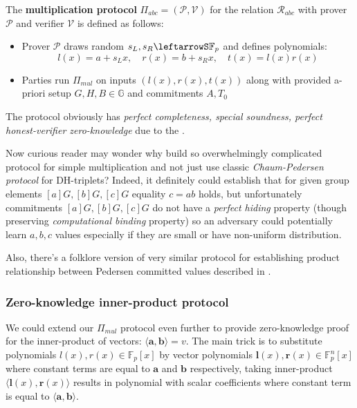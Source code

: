 \documentclass[../lecture-notes-148x210.tex]{subfiles}
\begin{document}
\begin{definition}
    The \textbf{multiplication protocol} $\Pi_{abc} = (\mathcal{P,V})$ for the relation $\mathcal{R}_{abc}$ with prover $\mathcal{P}$ and verifier $\mathcal{V}$ is defined as follows:
    \begin{itemize}
        \item Prover $\mathcal{P}$ draws random $s_L, s_R \leftarrowS \mathbb{F}_p$ and defines polynomials: $$l(x)=a+s_L x,\quad r(x)=b+s_R x,\quad t(x)=l(x)r(x)$$
        \item Parties run $\Pi_{mul}$ on inputs $(l(x),r(x),t(x))$ along with provided a-priori setup $G,H,B \in \mathbb{G}$ and commitments $A, T_0$
    \end{itemize}
\end{definition}
The protocol obviously has \textit{perfect completeness, special soundness, perfect honest-verifier zero-knowledge} due to the .

\begin{remark} %
    Now curious reader may wonder why build so overwhelmingly complicated protocol for simple multiplication and not just use classic \textit{Chaum-Pedersen protocol} for DH-triplets? Indeed, it definitely could establish that for given group elements $[a]G, [b]G, [c]G$ equality $c=ab$ holds, but unfortunately commitments $[a]G, [b]G, [c]G$ do not have a \textit{perfect hiding} property (though preserving \textit{computational binding} property) so an adversary could potentially learn $a,b,c$ values especially if they are small or have non-uniform distribution.
\end{remark}

Also, there's a folklore version of very similar protocol for establishing product relationship between Pedersen committed values described in \cite[section 12]{thaler2022proofs}.

\subsubsection{Zero-knowledge inner-product protocol}

We could extend our $\Pi_{mul}$ protocol even further to provide zero-knowledge proof for the inner-product of vectors: $\langle \mathbf{a, b} \rangle = v$. The main trick is to substitute polynomials $l(x), r(x) \in \mathbb{F}_p[x]$ by vector polynomials $\mathbf{l}(x), \mathbf{r}(x) \in \mathbb{F}_p^n[x]$ where constant terms are equal to $\mathbf{a}$ and $\mathbf{b}$ respectively, taking inner-product $\langle \mathbf{l}(x), \mathbf{r}(x) \rangle$ results in polynomial with scalar coefficients where constant term is equal to $\langle \mathbf{a, b} \rangle$.
\end{document}
